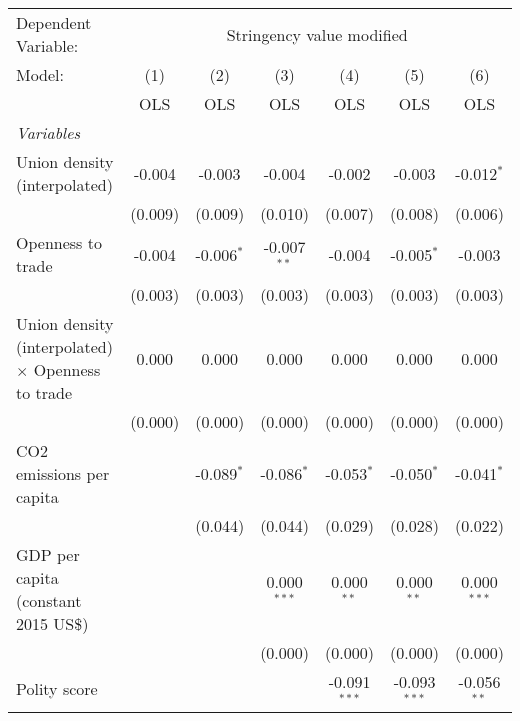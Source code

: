 
\begingroup
\centering
\begin{tabular}{lcccccc}
   \toprule
   Dependent Variable: & \multicolumn{6}{c}{Stringency value modified}\\
   Model:                                                   & (1)     & (2)          & (3)           & (4)            & (5)            & (6)\\  
                                                            &  OLS    & OLS          & OLS           & OLS            & OLS            & OLS\\  
   \midrule
   \emph{Variables}\\
   Union density (interpolated)                             & -0.004  & -0.003       & -0.004        & -0.002         & -0.003         & -0.012$^{*}$\\   
                                                            & (0.009) & (0.009)      & (0.010)       & (0.007)        & (0.008)        & (0.006)\\   
   Openness to trade                                        & -0.004  & -0.006$^{*}$ & -0.007$^{**}$ & -0.004         & -0.005$^{*}$   & -0.003\\   
                                                            & (0.003) & (0.003)      & (0.003)       & (0.003)        & (0.003)        & (0.003)\\   
   Union density (interpolated) $\times$ Openness to trade  & 0.000   & 0.000        & 0.000         & 0.000          & 0.000          & 0.000\\   
                                                            & (0.000) & (0.000)      & (0.000)       & (0.000)        & (0.000)        & (0.000)\\   
   CO2 emissions per capita                                 &         & -0.089$^{*}$ & -0.086$^{*}$  & -0.053$^{*}$   & -0.050$^{*}$   & -0.041$^{*}$\\   
                                                            &         & (0.044)      & (0.044)       & (0.029)        & (0.028)        & (0.022)\\   
   GDP per capita (constant 2015 US\$)                      &         &              & 0.000$^{***}$ & 0.000$^{**}$   & 0.000$^{**}$   & 0.000$^{***}$\\   
                                                            &         &              & (0.000)       & (0.000)        & (0.000)        & (0.000)\\   
   Polity score                                             &         &              &               & -0.091$^{***}$ & -0.093$^{***}$ & -0.056$^{**}$\\   

\end{tabular}
